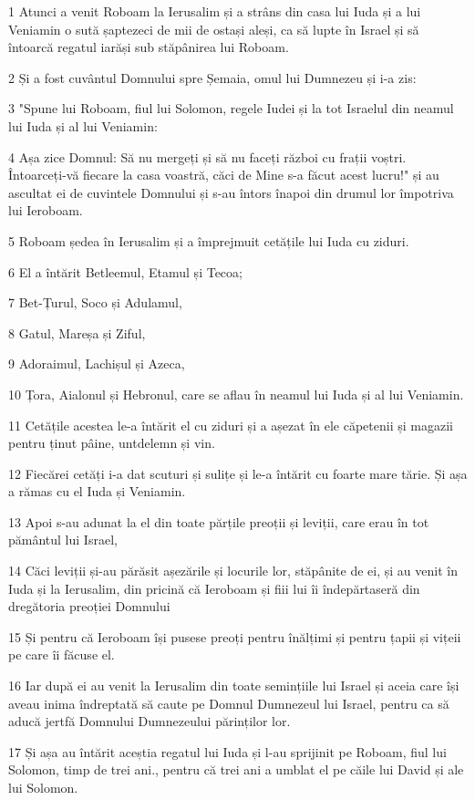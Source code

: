 \par 1 Atunci a venit Roboam la Ierusalim și a strâns din casa lui Iuda și a lui Veniamin o sută șaptezeci de mii de ostași aleși, ca să lupte în Israel și să întoarcă regatul iarăși sub stăpânirea lui Roboam.
\par 2 Și a fost cuvântul Domnului spre Șemaia, omul lui Dumnezeu și i-a zis:
\par 3 "Spune lui Roboam, fiul lui Solomon, regele Iudei și la tot Israelul din neamul lui Iuda și al lui Veniamin:
\par 4 Așa zice Domnul: Să nu mergeți și să nu faceți război cu frații voștri. Întoarceți-vă fiecare la casa voastră, căci de Mine s-a făcut acest lucru!" și au ascultat ei de cuvintele Domnului și s-au întors înapoi din drumul lor împotriva lui Ieroboam.
\par 5 Roboam ședea în Ierusalim și a împrejmuit cetățile lui Iuda cu ziduri.
\par 6 El a întărit Betleemul, Etamul și Tecoa;
\par 7 Bet-Țurul, Soco și Adulamul,
\par 8 Gatul, Mareșa și Ziful,
\par 9 Adoraimul, Lachișul și Azeca,
\par 10 Țora, Aialonul și Hebronul, care se aflau în neamul lui Iuda și al lui Veniamin.
\par 11 Cetățile acestea le-a întărit el cu ziduri și a așezat în ele căpetenii și magazii pentru ținut pâine, untdelemn și vin.
\par 12 Fiecărei cetăți i-a dat scuturi și sulițe și le-a întărit cu foarte mare tărie. Și așa a rămas cu el Iuda și Veniamin.
\par 13 Apoi s-au adunat la el din toate părțile preoții și leviții, care erau în tot pământul lui Israel,
\par 14 Căci leviții și-au părăsit așezările și locurile lor, stăpânite de ei, și au venit în Iuda și la Ierusalim, din pricină că Ieroboam și fiii lui îi îndepărtaseră din dregătoria preoției Domnului
\par 15 Și pentru că Ieroboam își pusese preoți pentru înălțimi și pentru țapii și vițeii pe care îi făcuse el.
\par 16 Iar după ei au venit la Ierusalim din toate semințiile lui Israel și aceia care își aveau inima îndreptată să caute pe Domnul Dumnezeul lui Israel, pentru ca să aducă jertfă Domnului Dumnezeului părinților lor.
\par 17 Și așa au întărit aceștia regatul lui Iuda și l-au sprijinit pe Roboam, fiul lui Solomon, timp de trei ani., pentru că trei ani a umblat el pe căile lui David și ale lui Solomon.
